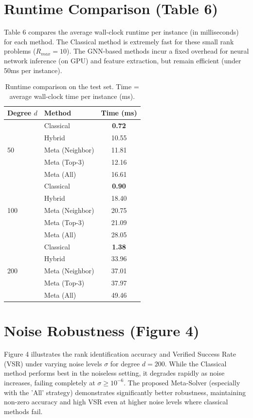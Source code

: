 \documentclass{article}
\begin{document}
\section{Runtime Comparison (Table 6)}

Table 6 compares the average wall-clock runtime per instance (in milliseconds) for each method. The Classical method is extremely fast for these small rank problems ($R_{max}=10$). The GNN-based methods incur a fixed overhead for neural network inference (on GPU) and feature extraction, but remain efficient (under 50ms per instance).

\begin{table}[ht]
\centering
\caption{Runtime comparison on the test set. Time = average wall-clock time per instance (ms).}
\label{tab:runtime}
\begin{tabular}{llc}
\toprule
\textbf{Degree} $d$ & \textbf{Method} & \textbf{Time (ms)} \\
\midrule
\multirow{5}{*}{50} & Classical & \textbf{0.72} \\
 & Hybrid & 10.55 \\
 & Meta (Neighbor) & 11.81 \\
 & Meta (Top-3) & 12.16 \\
 & Meta (All) & 16.61 \\
\midrule
\multirow{5}{*}{100} & Classical & \textbf{0.90} \\
 & Hybrid & 18.40 \\
 & Meta (Neighbor) & 20.75 \\
 & Meta (Top-3) & 21.09 \\
 & Meta (All) & 28.05 \\
\midrule
\multirow{5}{*}{200} & Classical & \textbf{1.38} \\
 & Hybrid & 33.96 \\
 & Meta (Neighbor) & 37.01 \\
 & Meta (Top-3) & 37.97 \\
 & Meta (All) & 49.46 \\
\bottomrule
\end{tabular}
\end{table}

\section{Noise Robustness (Figure 4)}

Figure 4 illustrates the rank identification accuracy and Verified Success Rate (VSR) under varying noise levels $\sigma$ for degree $d=200$. While the Classical method performs best in the noiseless setting, it degrades rapidly as noise increases, failing completely at $\sigma \ge 10^{-6}$. The proposed Meta-Solver (especially with the 'All' strategy) demonstrates significantly better robustness, maintaining non-zero accuracy and high VSR even at higher noise levels where classical methods fail.
\end{document}
